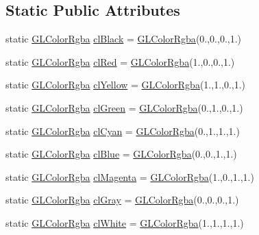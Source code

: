 \subsection*{Static Public Attributes}
\begin{DoxyCompactItemize}
\item 
static \mbox{\hyperlink{class_g_l_color_rgba}{G\+L\+Color\+Rgba}} \mbox{\hyperlink{class_g_l_color_rgba_a62741523011318e60e56d56c766ecd50}{cl\+Black}} = \mbox{\hyperlink{class_g_l_color_rgba}{G\+L\+Color\+Rgba}}(0.,0.,0.,1.)
\item 
static \mbox{\hyperlink{class_g_l_color_rgba}{G\+L\+Color\+Rgba}} \mbox{\hyperlink{class_g_l_color_rgba_aa83b7d12e38e4a7e649c4ce34874ac55}{cl\+Red}} = \mbox{\hyperlink{class_g_l_color_rgba}{G\+L\+Color\+Rgba}}(1.,0.,0.,1.)
\item 
static \mbox{\hyperlink{class_g_l_color_rgba}{G\+L\+Color\+Rgba}} \mbox{\hyperlink{class_g_l_color_rgba_ab0516f94c60823f22b2c8caf1dbe76b6}{cl\+Yellow}} = \mbox{\hyperlink{class_g_l_color_rgba}{G\+L\+Color\+Rgba}}(1.,1.,0.,1.)
\item 
static \mbox{\hyperlink{class_g_l_color_rgba}{G\+L\+Color\+Rgba}} \mbox{\hyperlink{class_g_l_color_rgba_afbceb0d8b2cbbc56d4ac491a7a87ea63}{cl\+Green}} = \mbox{\hyperlink{class_g_l_color_rgba}{G\+L\+Color\+Rgba}}(0.,1.,0.,1.)
\item 
static \mbox{\hyperlink{class_g_l_color_rgba}{G\+L\+Color\+Rgba}} \mbox{\hyperlink{class_g_l_color_rgba_a9c1574f1f48d60c98ffda644550ed3f6}{cl\+Cyan}} = \mbox{\hyperlink{class_g_l_color_rgba}{G\+L\+Color\+Rgba}}(0.,1.,1.,1.)
\item 
static \mbox{\hyperlink{class_g_l_color_rgba}{G\+L\+Color\+Rgba}} \mbox{\hyperlink{class_g_l_color_rgba_abf246bb4f542851d17ba84b5143a9214}{cl\+Blue}} = \mbox{\hyperlink{class_g_l_color_rgba}{G\+L\+Color\+Rgba}}(0.,0.,1.,1.)
\item 
static \mbox{\hyperlink{class_g_l_color_rgba}{G\+L\+Color\+Rgba}} \mbox{\hyperlink{class_g_l_color_rgba_a38ff3538a96d418ffe8e80ada6fc16be}{cl\+Magenta}} = \mbox{\hyperlink{class_g_l_color_rgba}{G\+L\+Color\+Rgba}}(1.,0.,1.,1.)
\item 
static \mbox{\hyperlink{class_g_l_color_rgba}{G\+L\+Color\+Rgba}} \mbox{\hyperlink{class_g_l_color_rgba_ac017bac6b8a0c5318a32277a9f8fa2b9}{cl\+Gray}} = \mbox{\hyperlink{class_g_l_color_rgba}{G\+L\+Color\+Rgba}}(0.,0.,0.,1.)
\item 
static \mbox{\hyperlink{class_g_l_color_rgba}{G\+L\+Color\+Rgba}} \mbox{\hyperlink{class_g_l_color_rgba_a71745b9d605d383870b32d83c79908dd}{cl\+White}} = \mbox{\hyperlink{class_g_l_color_rgba}{G\+L\+Color\+Rgba}}(1.,1.,1.,1.)
\end{DoxyCompactItemize}


